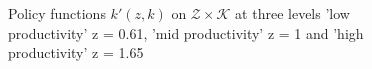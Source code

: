 \documentclass[12pt,english]{article}
\theoremstyle{remark}
\begin{document}
\begin{figure}
		
		\caption{Policy functions $k'(z,k)$ on $\mathcal{Z} \times \mathcal{K}$ at three levels 'low productivity' z = 0.61, 'mid productivity' z = 1 and 'high productivity' z = 1.65}
		\label{fig:main}
	\end{figure}
\end{document}
